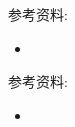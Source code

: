 \documentclass[a4paper, justified]{tufte-handout}
\begin{document}
\begin{solution}
\end{solution}

\beginot

\begin{ot}[]

  \noindent 参考资料:
  \begin{itemize}
    \item
  \end{itemize}
\end{ot}

\begin{ot}[]

  \noindent 参考资料:
  \begin{itemize}
    \item 
  \end{itemize}
\end{ot}




\beginfb

% 
% 
\end{document}
